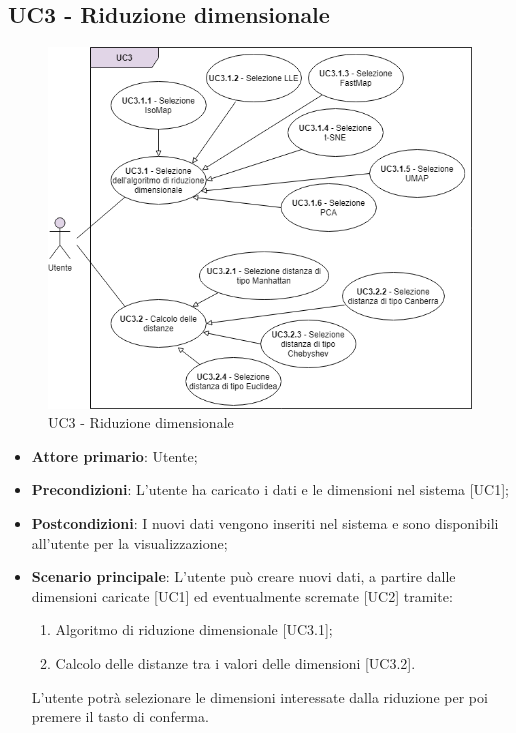 \newpage
\subsection{UC3 - Riduzione dimensionale}
\begin{figure}[h]
\includegraphics[width=16cm]{section/Images/UC3.png}
\centering
\caption{UC3 - Riduzione dimensionale}
\end{figure}
\begin{itemize}
	\item \textbf{Attore primario}: Utente;
	\item \textbf{Precondizioni}: L'utente ha caricato i dati e le dimensioni nel sistema [UC1];
	\item \textbf{Postcondizioni}: I nuovi dati vengono inseriti nel sistema e sono disponibili all'utente per la visualizzazione;
	\item \textbf{Scenario principale}: L'utente può creare nuovi dati, a partire dalle dimensioni caricate [UC1] ed eventualmente scremate [UC2] tramite:
	\begin{enumerate}[1.]
		\item Algoritmo di riduzione dimensionale [UC3.1];
		\item Calcolo delle distanze tra i valori delle dimensioni [UC3.2].
	\end{enumerate}
	L'utente potrà selezionare le dimensioni interessate dalla riduzione per poi premere il tasto di conferma.
\end{itemize}